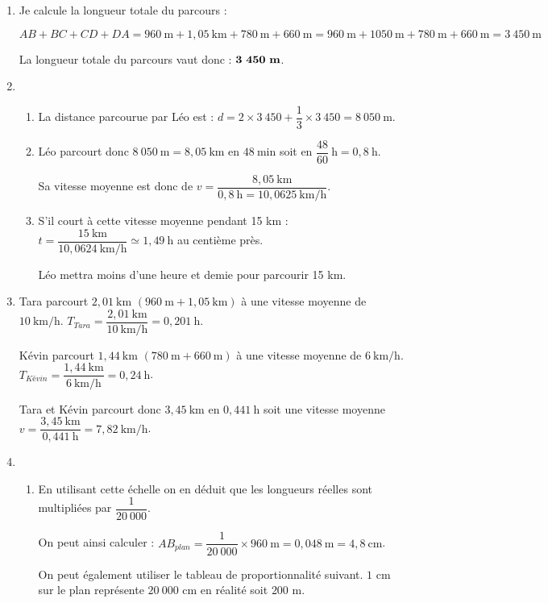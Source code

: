 \begin{enumerate}
\item Je calcule la longueur totale du parcours :

$AB + BC + CD + DA = 960~\text{m} + 1,05~\text{km} + 780~\text{m} + 660~\text{m} = 960~\text{m} + 1050~\text{m} + 780~\text{m} + 660~\text{m} = 3~450~\text{m}$

La longueur totale du parcours vaut donc : $\mathbf{3~450~\text{\textbf{m}}}$.
\item 
	\begin{enumerate}
		\item La distance parcourue par Léo est : $ d = 2 \times 3~450+\dfrac{1}{3}\times 3~450 = 8~050~\text{m}$.
		\item Léo parcourt donc $8~050~\text{m} = 8,05~\text{km}$ en $48~\text{min}$ soit en $\dfrac{48}{60}~\text{h} = 0,8~\text{h}$.
		
		Sa vitesse moyenne est donc de $v=\dfrac{8,05~\text{km}}{0,8~\text{h}=10,0625~\text{km/h}}$.
		\item S'il court à cette vitesse moyenne pendant 15 km : $t=\dfrac{15~\text{km}}{10,0624~\text{km/h}} \simeq 1,49~\text{h}$ au centième près.
		
		Léo mettra moins d’une heure et demie pour parcourir 15 km.
	\end{enumerate}
\item Tara parcourt $2,01~\text{km}$ $(960~\text{m} + 1,05~\text{km})$ à une vitesse moyenne de $10~\text{km/h}$. $T_{Tara}=\dfrac{2,01~\text{km}}{10~\text{km/h}}=0,201~\text{h}$.

Kévin parcourt $1,44~\text{km}$ $(780~\text{m} + 660~\text{m})$ à une vitesse moyenne de $6~\text{km/h}$.
$T_{Kévin}=\dfrac{1,44~\text{km}}{6~\text{km/h}}=0,24~\text{h}$.

Tara et Kévin parcourt donc $3,45~\text{km}$ en $0,441~\text{h}$ soit une vitesse moyenne
$v=\dfrac{3,45~\text{km}}{0,441~\text{h}}=7,82~\text{km/h}$.
\item 
	\begin{enumerate}
		\item En utilisant cette échelle on en déduit que les longueurs réelles sont multipliées par $\dfrac{1}{20~000}$.
		
		On peut ainsi calculer : $AB_{plan}= \dfrac{1}{20~000}\times 960~\text{m}=0,048~\text{m}=4,8~\text{cm}$.
		
		On peut également utiliser le tableau de proportionnalité suivant. $1$ cm sur le plan représente $20~000$ cm en réalité soit $200$ m.
		

\end{enumerate}
\end{enumerate}
